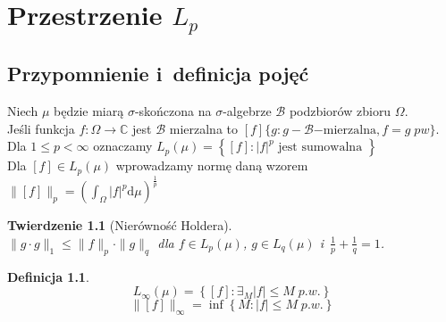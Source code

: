 \documentclass[11pt]{mwrep}
\renewcommand{\[}{\begin{equation}}
\renewcommand{\]}{\end{equation}}
\newcommand{\C}{{\ensuremath{\mathbb C}}}
\newcommand{\dd}{\mathrm{d}}
\newtheorem{twr}[subsection]{Twierdzenie}%
\newtheorem{de}[subsection]{Definicja}
\begin{document}
\chapter{Przestrzenie $L_p$}
\section{Przypomnienie i~definicja pojęć}
Niech $\mu$ będzie miarą $\sigma$-skończona na $\sigma$-algebrze $\mathcal{B}$ podzbiorów zbioru $\Omega$.\\
Jeśli funkcja $f\colon\Omega \to \C$ jest $\mathcal{B}$ mierzalna to  $[f] \{ g: g-\mathcal{B}\mathrm{-mierzalna}, f=g \; pw\}$.\\
Dla $1\le p <\infty$ oznaczamy $L_p(\mu)=\left\{ [f]: |f|^p \textrm{ jest sumowalna } \right\}$\\
Dla $[f] \in L_p(\mu)$ wprowadzamy normę daną wzorem $\|[f]\|_p = \left( \int_\Omega |f|^p \dd \mu \right)^{\frac{1}{p}}$\\
\begin{twr}[Nierówność Holdera]\mbox{}\\
	$\|g \cdot g \|_1 \le \|f\|_p\cdot \|g\|_{q}$ dla $f \in L_p (\mu)$, $g \in L_q(\mu)$ i~$\frac{1}{p}+\frac{1}{q}=1$.
\end{twr}
\begin{de}
	$$L_\infty(\mu) = \left\{ [f] : \exists_M |f| \le M\; p.w. \right\}$$
	$$\|[f]\|_\infty = \inf \left\{ M: |f| \le M \; p.w. \right\}$$
\end{de}
\end{document}
